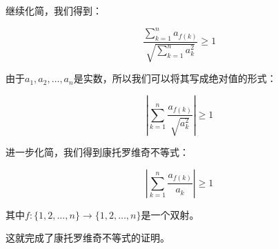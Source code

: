 \documentclass[UTF8]{ctexart}
\begin{document}
继续化简，我们得到：

\[
    \frac{\sum_{k=1}^{n} a_{f(k)}}{\sqrt{\sum_{k=1}^{n} a_k^2}} \geq 1
\]

由于$a_1, a_2, \dots, a_n$是实数，所以我们可以将其写成绝对值的形式：

\[
    \left| \sum_{k=1}^{n} \frac{a_{f(k)}}{\sqrt{a_k^2}} \right| \geq 1
\]

进一步化简，我们得到康托罗维奇不等式：

\[
    \left| \sum_{k=1}^{n} \frac{a_{f(k)}}{a_k} \right| \geq 1
\]

其中$f:\{1,2,\dots,n\} \rightarrow \{1,2,\dots,n\}$是一个双射。

这就完成了康托罗维奇不等式的证明。
\end{document}
